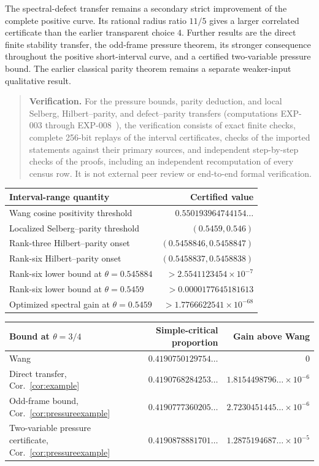﻿\documentclass[11pt]{article}
\theoremstyle{remark}
\begin{document}
The spectral-defect transfer remains a secondary strict improvement of the
complete positive curve. Its rational radius ratio $11/5$ gives a larger
correlated certificate than the earlier transparent choice $4$. Further
results are the direct finite stability transfer, the odd-frame pressure
theorem, its stronger consequence throughout the positive short-interval
curve, and a certified two-variable pressure bound. The earlier classical
parity theorem remains a separate weaker-input qualitative result.

\begin{quote}\small
\textbf{Verification.} For the pressure bounds, parity deduction, and local
Selberg, Hilbert--parity, and defect--parity transfers (computations EXP-003
through EXP-008~\cite{RecordIII,RecordIV,RecordV,RecordVI,RecordVII,RecordVIII}), the
verification consists of exact finite checks, complete 256-bit replays of
the interval certificates, checks of the imported statements against their
primary sources, and independent step-by-step checks of the proofs,
including an independent recomputation of every census row. It is not
external peer review or end-to-end formal verification.
\end{quote}

\begin{center}\small
\begin{tabular}{lr}
\toprule
Interval-range quantity & Certified value\\
\midrule
Wang cosine positivity threshold & $0.550193964744154\ldots$\\
Localized Selberg--parity threshold & $(0.5459,0.546)$\\
Rank-three Hilbert--parity onset & $(0.5458846,0.5458847)$\\
Rank-six Hilbert--parity onset & $(0.5458837,0.5458838)$\\
Rank-six lower bound at $\theta=0.545884$ & $>2.5541123454\times10^{-7}$\\
Rank-six lower bound at $\theta=0.5459$ & $>0.0000177645181613$\\
Optimized spectral gain at $\theta=0.5459$ & $>1.7766622541\times10^{-68}$\\
\bottomrule
\end{tabular}
\end{center}

\begin{center}\small
\begin{tabular}{lrr}
\toprule
Bound at $\theta=3/4$ & Simple-critical proportion & Gain above Wang\\
\midrule
Wang & $0.4190750129754\ldots$ & $0$\\
Direct transfer, Cor.~\ref{cor:example} & $0.4190768284253\ldots$ & $1.8154498796\ldots\times10^{-6}$\\
Odd-frame bound, Cor.~\ref{cor:pressureexample} & $0.4190777360205\ldots$ & $2.7230451445\ldots\times10^{-6}$\\
Two-variable pressure certificate, Cor.~\ref{cor:pressureexample} & $0.4190878881701\ldots$ & $1.2875194687\ldots\times10^{-5}$\\
\bottomrule
\end{tabular}
\end{center}
\end{document}
